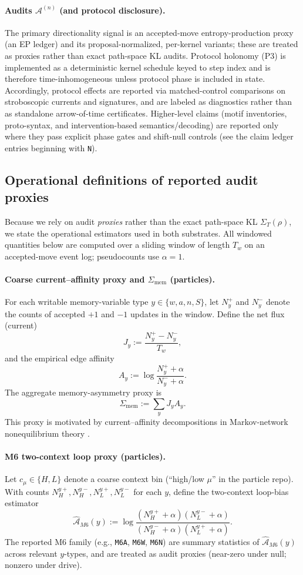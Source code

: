 \documentclass[11pt]{article}
\newcommand{\Audit}{\mathcal A}
\newcommand{\Sig}{\Sigma}
\begin{document}
\paragraph{Audits $\Audit^{(n)}$ (and protocol disclosure).}
The primary directionality signal is an accepted-move entropy-production proxy (an EP ledger) and its proposal-normalized, per-kernel variants; these are treated as proxies rather than exact path-space KL audits. Protocol holonomy (P3) is implemented as a deterministic kernel schedule keyed to step index and is therefore time-inhomogeneous unless protocol phase is included in state. Accordingly, protocol effects are reported via matched-control comparisons on stroboscopic currents and signatures, and are labeled as diagnostics rather than as standalone arrow-of-time certificates. Higher-level claims (motif inventories, proto-syntax, and intervention-based semantics/decoding) are reported only where they pass explicit phase gates and shift-null controls (see the claim ledger entries beginning with \texttt{N}).

\subsection{Operational definitions of reported audit proxies}\label{sec:inst:auditdefs}
Because we rely on audit \emph{proxies} rather than the exact path-space KL $\Sig_T(\rho)$, we state the operational estimators used in both substrates. All windowed quantities below are computed over a sliding window of length $T_w$ on an accepted-move event log; pseudocounts use $\alpha=1$.

\paragraph{Coarse current--affinity proxy and $\Sigma_{\mathrm{mem}}$ (particles).}
For each writable memory-variable type $y\in\{w,a,n,S\}$, let $N^{+}_{y}$ and $N^{-}_{y}$ denote the counts of accepted $+1$ and $-1$ updates in the window. Define the net flux (current)
\[
J_y:=\frac{N^{+}_{y}-N^{-}_{y}}{T_w},
\]
and the empirical edge affinity
\[
A_y:=\log\frac{N^{+}_{y} + \alpha}{N^{-}_{y} + \alpha}.
\]
The aggregate memory-asymmetry proxy is
\[
\Sigma_{\mathrm{mem}}:=\sum_y J_yA_y.
\]
This proxy is motivated by current--affinity decompositions in Markov-network nonequilibrium theory \citep{Schnakenberg1976,AltanerEtAl2012,Seifert2012}.

\paragraph{M6 two-context loop proxy (particles).}
Let $c_\mu\in\{H,L\}$ denote a coarse context bin (``high/low $\mu$'' in the particle repo). With counts $N^{y+}_{H},N^{y-}_{H},N^{y+}_{L},N^{y-}_{L}$ for each $y$, define the two-context loop-bias estimator
\[
\widehat{\mathcal A}_{M6}(y):=\log\frac{(N^{y+}_{H}+\alpha)(N^{y-}_{L}+\alpha)}{(N^{y-}_{H}+\alpha)(N^{y+}_{L}+\alpha)}.
\]
The reported M6 family (e.g., \texttt{M6A}, \texttt{M6W}, \texttt{M6N}) are summary statistics of $\widehat{\mathcal A}_{M6}(y)$ across relevant $y$-types, and are treated as audit proxies (near-zero under null; nonzero under drive).
\end{document}
